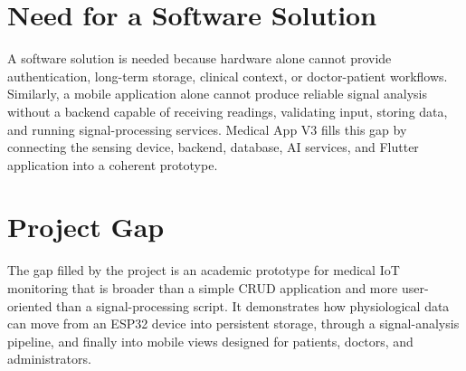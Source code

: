 \section{Need for a Software Solution}

A software solution is needed because hardware alone cannot provide authentication, long-term storage, clinical context, or doctor-patient workflows. Similarly, a mobile application alone cannot produce reliable signal analysis without a backend capable of receiving readings, validating input, storing data, and running signal-processing services. Medical App V3 fills this gap by connecting the sensing device, backend, database, AI services, and Flutter application into a coherent prototype.

\section{Project Gap}

The gap filled by the project is an academic prototype for medical IoT monitoring that is broader than a simple CRUD application and more user-oriented than a signal-processing script. It demonstrates how physiological data can move from an ESP32 device into persistent storage, through a signal-analysis pipeline, and finally into mobile views designed for patients, doctors, and administrators.
